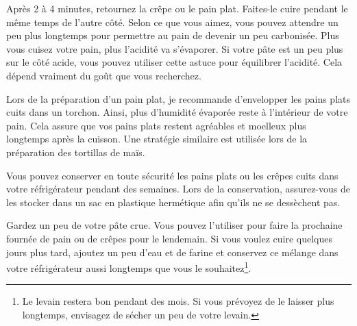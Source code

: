 Après 2 à 4 minutes, retournez la crêpe ou le pain plat. Faites-le cuire pendant le même
temps de l'autre côté. Selon ce que vous aimez, vous pouvez attendre un peu
plus longtemps pour permettre au pain de devenir un peu carbonisée. Plus vous
cuisez votre pain, plus l'acidité va s'évaporer. Si votre
pâte est un peu plus sur le côté acide, vous pouvez utiliser cette astuce pour équilibrer
l'acidité. Cela dépend vraiment du goût que vous recherchez.

Lors de la préparation d'un pain plat, je recommande d'envelopper les pains plats cuits
dans un torchon. Ainsi, plus d'humidité évaporée
reste à l'intérieur de votre pain. Cela assure que vos pains plats restent
agréables et moelleux plus longtemps après la cuisson. Une stratégie similaire est
utilisée lors de la préparation des tortillas de maïs.

Vous pouvez conserver en toute sécurité les pains plats ou les crêpes cuits dans votre réfrigérateur
pendant des semaines. Lors de la conservation, assurez-vous de les stocker dans un sac en plastique hermétique afin qu'ils
ne se dessèchent pas.

Gardez un peu de votre pâte crue. Vous pouvez l'utiliser pour faire la prochaine
fournée de pain ou de crêpes pour le lendemain. Si vous voulez cuire quelques jours plus tard, ajoutez
un peu d'eau et de farine et conservez ce mélange dans votre réfrigérateur
aussi longtemps que vous le souhaitez\footnote{Le levain restera bon pendant des mois. Si vous prévoyez de
le laisser plus longtemps, envisagez de sécher un peu de votre levain.}.
